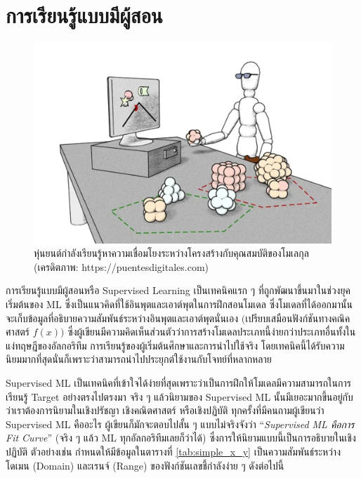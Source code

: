 

\chapter{การเรียนรู้แบบมีผู้สอน}
\label{ch:sup_ml}

\begin{figure}[H]
    \centering
    \includegraphics[width=0.65\linewidth]{fig/supervised_ml.png}
    \caption{หุ่นยนต์กำลังเรียนรู้หาความเชื่อมโยงระหว่างโครงสร้างกับคุณสมบัติของโมเลกุล (เครดิตภาพ: https://puentesdigitales.com)}
    \label{fig:supervised_ml}
\end{figure}

การเรียนรู้แบบมีผู้สอนหรือ Supervised Learning เป็นเทคนิคแรก ๆ ที่ถูกพัฒนาขึ้นมาในช่วงยุคเริ่มต้นของ ML ซึ่งเป็นแนวคิดที่ใช้อินพุตและเอาต์พุตในการฝึกสอนโมเดล ซึ่งโมเดลที่ได้ออกมานั้นจะเก็บข้อมูลที่อธิบายความสัมพันธ์ระหว่างอินพุตและเอาต์พุตนั่นเอง $($เปรียบเสมือนฟังก์ชันทางคณิคศาสตร์ $f(x))$ ซึ่งผู้เขียนมีความคิดเห็นส่วนตัวว่าการสร้างโมเดลประเภทนี้ง่ายกว่าประเภทอื่นทั้งในแง่ทฤษฎีของอัลกอริทึม การเรียนรู้ของผู้เริ่มต้นศึกษาและการนำไปใช้จริง โดยเทคนิคนี้ได้รับความนิยมมากที่สุดนั่นก็เพราะว่าสามารถนำไปประยุกต์ใช้งานกับโจทย์ที่หลากหลาย

Supervised ML เป็นเทคนิคที่เข้าใจได้ง่ายที่สุดเพราะว่าเป็นการฝึกให้โมเดลมีความสามารถในการเรียนรู้ Target อย่างตรงไปตรงมา จริง ๆ แล้วนิยามของ Supervised ML นั้นมีเยอะมากขึ้นอยู่กับว่าเราต้องการนิยามในเชิงปรัชญา เชิงคณิตศาสตร์ หรือเชิงปฏิบัติ ทุกครั้งที่มีคนถามผู้เขียนว่า Supervised ML คืออะไร ผู้เขียนก็มักจะตอบไปสั้น ๆ แบบไม่จริงจังว่า \enquote{\textit{Supervised ML คือการ Fit Curve}} (จริง ๆ แล้ว ML ทุกอัลกอริทึมเลยก็ว่าได้) ซึ่งการให้นิยามแบบนี้เป็นการอธิบายในเชิงปฏิบัติ ตัวอย่างเช่น กำหนดให้มีข้อมูลในตารางที่ \ref{tab:simple_x_y} เป็นความสัมพันธ์ระหว่างโดเมน (Domain) และเรนจ์ (Range) ของฟังก์ชันเลขชี้กำลังง่าย ๆ ดังต่อไปนี้


